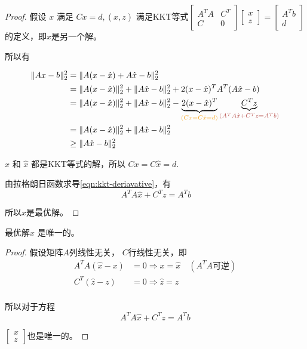 \begin{proof}
    假设 $ x $ 满足 $ C x=d,(\hat{x}, z) $ 满足KKT等式$ \left[\begin{array}{cc}A^{T} A & C^{T} \\ {C} & 0\end{array}\right]\left[\begin{array}{l}x \\ z\end{array}\right]=\left[\begin{array}{l}A^{T} b \\ d\end{array}\right] $的定义，即$x$是另一个解。

    所以有

    $$\begin{aligned}
        \| Ax-b\| _{2}^{2} & =\| A(x-\hat{x} )+A\hat{x} -b\| _{2}^{2}\\
         & =\| A(x-\hat{x} )\| _{2}^{2} +\| A\hat{x} -b\| _{2}^{2} +2(x-\hat{x} )^{T} A^{T} (A\hat{x} -b)\\
         & =\| A(x-\hat{x} )\| _{2}^{2} +\| A\hat{x} -b\| _{2}^{2} -\underbrace{2(x-\hat{x} )^{T}}_{\textcolor[rgb]{0.96,0.65,0.14}{(Cx=C\hat{x} =d)}}\underbrace{C^{T} z}_{\textcolor[rgb]{0.72,0.33,0.31}{ \left( A^{T} A\hat{x} +C^{T} z=A^{T} b\right)}}\\
         & =\| A(x-\hat{x} )\| _{2}^{2} +\| A\hat{x} -b\| _{2}^{2}\\
         & \geq \| A\hat{x} -b\| _{2}^{2}
        \end{aligned}$$

    \begin{remark}
        $x$ 和 $\hat{x}$ 都是KKT等式的解，所以 $Cx = C \hat{x} = d$.

        由拉格朗日函数求导\ref{eqn:kkt-deriavative}，有
        $$\ A^{T} A\hat{x} +C^{T} z=A^{T} b$$
        
    \end{remark}

        所以$\hat{x}$是最优解。
\end{proof}

\begin{theorem}[KKT等式最优解的唯一性]
    最优解$ \hat{x} $ 是唯一的。
\end{theorem}

\begin{proof}
    假设矩阵$A$列线性无关， $C$行线性无关，即
    $$
    \begin{aligned}
    A^{T} A(\hat{x}-x) &=0 \Rightarrow x=\hat{x} \quad (A^TA 可逆) \\
    C^{T}(\hat{z}-z) &=0 \Rightarrow \hat{z}=z \\
    \end{aligned}
    $$

    所以对于方程
    $$A^{T} A \hat{x}+C^{T} z =A^{T} b$$

    $\left[\begin{array}{l}x \\ z\end{array}\right]$也是唯一的。
\end{proof}
        
